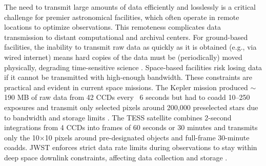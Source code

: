 The need to transmit large amounts of data efficiently and losslessly is a critical challenge for premier astronomical facilities, which often operate in remote locations to optimize observations. 
This remoteness complicates data transmission to distant computational and archival centers. For ground-based facilities, the inability to transmit raw data as quickly as it is obtained (e.g., via wired internet) means hard copies of the data must be (periodically) moved physically, degrading time-sensitive science \citep{Bezerra}. Space-based facilities risk losing data if it cannot be transmitted with high-enough bandwidth.
%
These constraints are practical and evident in current space missions. The Kepler mission \citep{2010Sci...327..977B} produced $\sim$190 MB of raw data from 42 CCDs every ~6 seconds but had to coadd 10--250 exposures and transmit only selected pixels around 200,000 preselected stars due to bandwidth and storage limits \citep{10.1117/12.897767}. The TESS satellite \citep{2015JATIS...1a4003R} combines 2-second integrations from 4 CCDs into frames of 60 seconds or 30 minutes and transmits only the 10$\times$10 pixels around pre-designated objects and full-frame 30-minute coadds. JWST enforces strict data rate limits during observations to stay within deep space downlink constraints, affecting data collection and storage \citep{jwst}.
